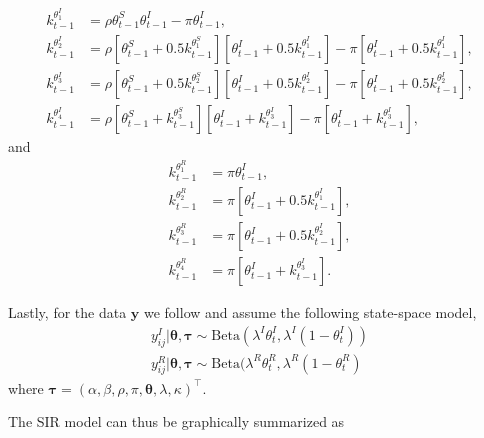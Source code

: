 \documentclass[10pt,a4paper]{article}
\begin{document}
\begin{equation*}
	\begin{split}	
		k_{t-1}^{\theta^I_1} &= \rho \theta_{t-1}^S \theta_{t-1}^I - \pi \theta^I_{t-1}, \\
		k_{t-1}^{\theta^I_2} &= \rho [\theta_{t-1}^S + 0.5 k_{t-1}^{\theta^S_1}] [\theta_{t-1}^I + 0.5 k_{t-1}^{\theta^I_1}] - \pi[\theta_{t-1}^I + 0.5 k_{t-1}^{\theta^I_1}], \\
		k_{t-1}^{\theta^I_3} &= \rho [\theta_{t-1}^S + 0.5 k_{t-1}^{\theta^S_2}] [\theta_{t-1}^I + 0.5 k_{t-1}^{\theta^I_2}] - \pi[\theta_{t-1}^I + 0.5 k_{t-1}^{\theta^I_2}], \\
		k_{t-1}^{\theta^I_4} &= \rho [\theta_{t-1}^S + k_{t-1}^{\theta^S_3}] [\theta_{t-1}^I + k_{t-1}^{\theta^I_3}] - \pi[\theta_{t-1}^I + k_{t-1}^{\theta^I_3}], 
	\end{split}
\end{equation*}
%
and 
%
\begin{equation*}
	\begin{split}	
		k_{t-1}^{\theta^R_1} &= \pi \theta^I_{t-1}, \\
		k_{t-1}^{\theta^R_2} &= \pi[\theta_{t-1}^I + 0.5 k_{t-1}^{\theta^I_1}], \\
		k_{t-1}^{\theta^R_3} &= \pi[\theta_{t-1}^I + 0.5 k_{t-1}^{\theta^I_2}], \\
		k_{t-1}^{\theta^R_4} &= \pi[\theta_{t-1}^I + k_{t-1}^{\theta^I_3}]. 
	\end{split}
\end{equation*}
%

Lastly, for the data $\mathbf{y}$  we follow \parencite{song2020epidemiological} and assume the following state-space model,  
%
\begin{equation}
\begin{aligned}
	y_{ij}^I | \boldsymbol{\theta}, \boldsymbol{\tau} \sim \text{Beta}(\lambda^I \theta_t^I, \lambda^I(1 - \theta_t^I)) \\
	y_{ij}^R | \boldsymbol{\theta}, \boldsymbol{\tau} \sim \text{Beta}(\lambda^R \theta_t^R, \lambda^R(1 - \theta_t^R)
\end{aligned}
\end{equation}
%
where 
%
$
\boldsymbol{\tau} = (\alpha, \beta, \rho, \pi, \mathbf{\theta}, \lambda, \kappa)^\top.
$
%

The SIR model can thus be graphically summarized as 

\end{document}
